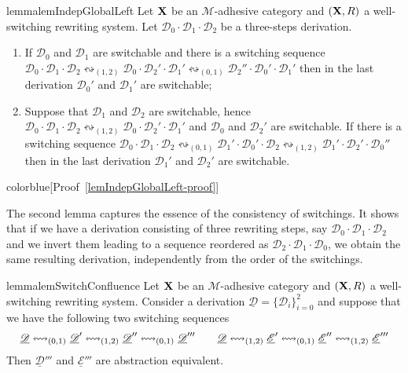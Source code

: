 \documentclass[a4paper,UKenglish,cleveref,pdftex,thm-restate,numberwithinsect]{lipics-v2021}
\newcommand{\full}[1]{{color{blue}#1}}
\newcommand{\full}[1]{}
\def\R{\mathsf{R}}
\def\X{\textbf {\textup{X}}}
\newcommand{\dder}[1]{\mathscr{#1}}
\newcommand{\der}[1]{\underline{\dder{#1}}}
\newcommand{\shift}[1]{\ensuremath{\mathrel{{\leftrightsquigarrow}_{#1}}}}
\begin{document}
\begin{restatable}{lemma}{lemIndepGlobalLeft}
  \label{lem:indep-global-left}
  Let $\X$ be an $\mathcal{M}$-adhesive category and $(\X,\R)$ a
  well-switching rewriting system.  Let
  $\dder{D}_0\cdot \dder{D}_1 \cdot \dder{D}_2$ be a three-steps
  derivation.
  \begin{enumerate}
  \item
    \label{lem:indep-global-left:1}
    If $\dder{D}_0$ and $\dder{D}_1$ are switchable and there is a
    switching sequence
    $\dder{D}_0\cdot \dder{D}_1 \cdot \dder{D}_2 \shift{(1,2)}
    \dder{D}_0 \cdot \dder{D}_2' \cdot \dder{D}_1' \shift{(0,1)}
    \dder{D}_2'' \cdot \dder{D}_0' \cdot \dder{D}_1'$ then
    in the last derivation $\dder{D}_0'$ and $\dder{D}_1'$ are switchable;
    
  \item
    \label{lem:indep-global-left:2}
    Suppose that $\dder{D}_1$ and $\dder{D}_2$ are switchable, hence $\dder{D}_0\cdot \dder{D}_1 \cdot \dder{D}_2 \shift{(1,2)}
    \dder{D}_0 \cdot \dder{D}_2' \cdot \dder{D}_1'$ and $\dder{D}_0$ and $\dder{D}_2'$ are switchable.  If there
    is a switching sequence
    $\dder{D}_0\cdot \dder{D}_1 \cdot \dder{D}_2 \shift{(0,1)}
    \dder{D}_1' \cdot \dder{D}_0' \cdot \dder{D}_2 \shift{(1,2)}
    \dder{D}_1' \cdot \dder{D}_2' \cdot \dder{D}_0''$ then in the last derivation $\dder{D}_1'$ and $\dder{D}_2'$ are switchable.
  \end{enumerate}
\end{restatable}

\full{[Proof~\ref{lemIndepGlobalLeft-proof}]}


The second lemma captures the essence of the consistency of
switchings. It shows that if we have a derivation consisting of three
rewriting steps, say $\dder{D}_0\cdot \dder{D}_1\cdot  \dder{D}_2$ and we invert them leading to a
sequence reordered as $\dder{D}_2\cdot  \dder{D}_1\cdot  \dder{D}_0$, we obtain the same resulting derivation,
independently from the order of the switchings.


\begin{restatable}{lemma}{lemSwitchConfluence}
	\label{lem:switch-confluence}
	Let $\X$ be an $\mathcal{M}$-adhesive category and $(\X,\R)$ a well-switching rewriting system.
	Consider a derivation $\der{D}=\{\dder{D}_i\}_{i=0}^2$ and suppose that we have the following two switching sequences
	\[\der{D} \shift{(0,1)} \der{D}' \shift{(1,2)} \der{D}'' \shift{(0,1)}\der{D}'''\\
          \qquad \der{D}\shift{(1,2)}\der{E}'\shift{(0,1)} \der{E}'' \shift{(1,2)}\der{E}''' \]
Then $\der{D}'''$ and $\der{E}'''$ are abstraction equivalent. 
\end{restatable}
\end{document}
